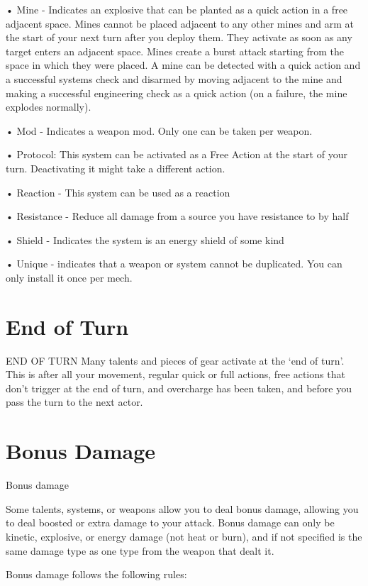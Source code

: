 •  Mine - Indicates an explosive that can be planted as a quick action in a free adjacent space.
  Mines cannot be placed adjacent to any other mines and arm at the start of your next turn after
  you deploy them. They activate as soon as any target enters an adjacent space. Mines create a
  burst attack starting from the space in which they were placed. A mine can be detected with a
  quick action and a successful systems check and disarmed by moving adjacent to the mine
  and making a successful engineering check as a quick action (on a failure, the mine explodes
  normally).

•  Mod - Indicates a weapon mod. Only one can be taken per weapon.

•  Protocol: This system can be activated as a Free Action at the start of your turn. Deactivating
  it might take a different action.

•  Reaction - This system can be used as a reaction

•  Resistance - Reduce all damage from a source you have resistance to by half

•  Shield - Indicates the system is an energy shield of some kind

•  Unique - indicates that a weapon or system cannot be duplicated. You can only install it once
  per mech.

\section{End of Turn}
                                              END OF TURN
Many talents and pieces of gear activate at the ‘end of turn’. This is after all your movement,
regular quick or full actions, free actions that don’t trigger at the end of turn, and overcharge has
been taken, and before you pass the turn to the next actor.
\section{Bonus Damage}
                                              Bonus damage

Some talents, systems, or weapons allow you to deal bonus damage, allowing you to deal
boosted or extra damage to your attack. Bonus damage can only be kinetic, explosive, or energy
damage (not heat or burn), and if not specified is the same damage type as one type from the
weapon that dealt it.





Bonus damage follows the following rules:

